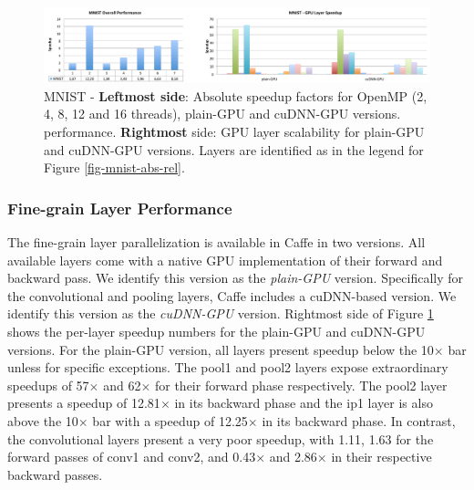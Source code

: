 
\begin{figure}[]
\includegraphics[width=\textwidth]{figures/mnist-abs-perf+gpu-layer.pdf}
\caption{MNIST - \textbf{Leftmost side}: Absolute speedup factors for OpenMP (2, 4, 8, 12 and 16 threads), plain-GPU and cuDNN-GPU versions. performance. \textbf{Rightmost} side: GPU layer scalability for plain-GPU and cuDNN-GPU versions. Layers are identified as in the legend for Figure \ref{fig-mnist-abs-rel}.}
\label{fig-mnist-overall}
\end{figure}

\subsubsection{Fine-grain Layer Performance}
The fine-grain layer parallelization is available in Caffe in two versions. 
All available layers come with a native GPU implementation of their 
forward and backward pass. We identify this version as the \emph{plain-GPU} 
version. Specifically for the convolutional and pooling layers, Caffe 
includes a cuDNN-based version. We identify this version as the 
\emph{cuDNN-GPU} version. 
Rightmost side of Figure \ref{fig-mnist-overall} shows the per-layer 
speedup numbers for the plain-GPU and cuDNN-GPU versions. 
For the plain-GPU version, all layers present speedup below 
the 10$\times$ bar unless for specific exceptions. The pool1 and pool2 
layers expose extraordinary speedups of 57$\times$ and 62$\times$ for their 
forward phase respectively. The pool2 layer presents a speedup of 
12.81$\times$ in its backward phase and the ip1 layer is also above the 
10$\times$ bar with a speedup of 12.25$\times$ in its backward phase.
In contrast, the convolutional layers present a very poor speedup, with 
1.11, 1.63 for the forward passes of conv1 and conv2, and 0.43$\times$ and 2.86$\times$ 
in their respective backward passes. 

